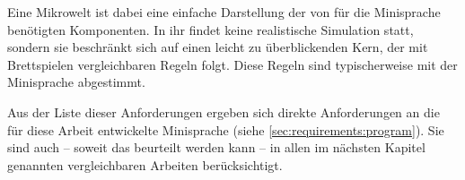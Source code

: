Eine Mikrowelt ist dabei eine einfache Darstellung der von für die Minisprache benötigten Komponenten. In ihr findet keine realistische Simulation statt, sondern sie beschränkt sich auf einen leicht zu überblickenden Kern, der mit Brettspielen vergleichbaren Regeln folgt. Diese Regeln sind typischerweise mit der Minisprache abgestimmt.

Aus der Liste dieser Anforderungen ergeben sich direkte Anforderungen an die für diese Arbeit entwickelte Minisprache (siehe \ref{sec:requirements:program}). Sie sind auch -- soweit das beurteilt werden kann -- in allen im nächsten Kapitel genannten vergleichbaren Arbeiten berücksichtigt.

